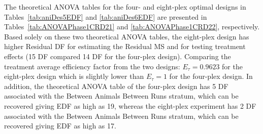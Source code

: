 The theoretical ANOVA tables for the four- and eight-plex optimal designs in Tables~\ref{tab:aniDes5EDF} and \ref{tab:aniDes6EDF} are presented in Tables~\ref{tab:ANOVAPhase1CRD21} and \ref{tab:ANOVAPhase1CRD22}, respectively. Based solely on these two theoretical ANOVA tables, the eight-plex design  has higher Residual DF for estimating the Residual MS and for testing treatment effects (15 DF compared 14 DF for the four-plex design). Comparing the treatment average efficiency factor from the two designs: $E_\tau = 0.9623$ for the eight-plex design which is slightly lower than $E_\tau =1$ for the four-plex design. In addition, the theoretical ANOVA table of the four-plex design has 5 DF associated with the Between Animals Between Runs stratum, which can be recovered giving EDF as high as 19, whereas the eight-plex experiment has 2 DF associated with the Between Animals Between Runs stratum, which can be recovered giving EDF as high as 17.  

